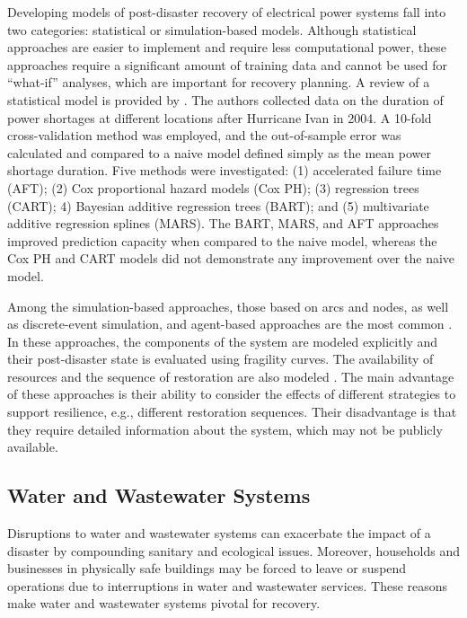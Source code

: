 Developing models of post-disaster recovery of electrical power systems fall into two categories:  statistical or simulation-based models. Although statistical approaches are easier to implement and require less computational power, these approaches require a significant amount of training data and cannot be used for ``what-if'' analyses, which are important for recovery planning. A review of a statistical model is provided by \citet{liu2007statistical}. The authors collected data on the duration of power shortages at different locations after Hurricane Ivan in 2004. A 10-fold cross-validation method was employed, and the out-of-sample error was calculated and compared to a naive model defined simply as the mean power shortage duration. Five methods were investigated: (1) accelerated failure time (AFT); (2) Cox proportional hazard models (Cox PH); (3) regression trees (CART); 4) Bayesian additive regression trees (BART); and (5) multivariate additive regression splines (MARS). The BART, MARS, and AFT approaches improved prediction capacity when compared to the naive model, whereas the Cox PH and CART models did not demonstrate any improvement over the naive model. \ 

Among the simulation-based approaches, those based on arcs and nodes, as well as discrete-event simulation, and agent-based approaches are the most common \citep{Eusgeld2008a, ouyang2014review, sun2019resilience}. In these approaches, the components of the system are modeled explicitly and their post-disaster state is evaluated using fragility curves. The availability of resources and the sequence of restoration are also modeled \citep{ouyang2014multi}. The main advantage of these approaches is their ability to consider the effects of different strategies to support resilience, e.g., different restoration sequences. Their disadvantage is that they require detailed information about the system, which may not be publicly available. \ 

\subsection{Water and Wastewater Systems}
Disruptions to water and wastewater systems can exacerbate the impact of a disaster by compounding sanitary and ecological issues. Moreover, households and businesses in physically safe buildings may be forced to leave or suspend operations due to interruptions in water and wastewater services. These reasons make water and wastewater systems pivotal for recovery.\

